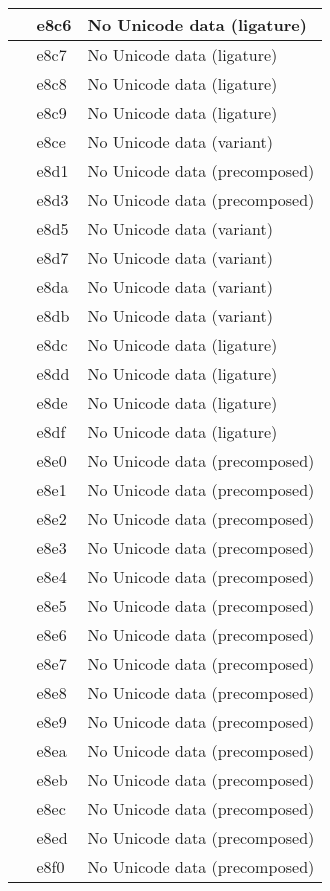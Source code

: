 \documentclass[12pt,letterpaper,openany]{book}
\begin{document}
\begin{center}
\begin{supertabular}{|m{0.25in}|m{0.5in}|m{4in}|}
 & e8c6 & No Unicode data (ligature)\\\hline
 & e8c7 & No Unicode data (ligature)\\\hline
 & e8c8 & No Unicode data (ligature)\\\hline
 & e8c9 & No Unicode data (ligature)\\\hline
 & e8ce & No Unicode data (variant)\\\hline
 & e8d1 & No Unicode data (precomposed)\\\hline
 & e8d3 & No Unicode data (precomposed)\\\hline
 & e8d5 & No Unicode data (variant)\\\hline
 & e8d7 & No Unicode data (variant)\\\hline
 & e8da & No Unicode data (variant)\\\hline
 & e8db & No Unicode data (variant)\\\hline
 & e8dc & No Unicode data (ligature)\\\hline
 & e8dd & No Unicode data (ligature)\\\hline
 & e8de & No Unicode data (ligature)\\\hline
 & e8df & No Unicode data (ligature)\\\hline
 & e8e0 & No Unicode data (precomposed)\\\hline
 & e8e1 & No Unicode data (precomposed)\\\hline
 & e8e2 & No Unicode data (precomposed)\\\hline
 & e8e3 & No Unicode data (precomposed)\\\hline
 & e8e4 & No Unicode data (precomposed)\\\hline
 & e8e5 & No Unicode data (precomposed)\\\hline
 & e8e6 & No Unicode data (precomposed)\\\hline
 & e8e7 & No Unicode data (precomposed)\\\hline
 & e8e8 & No Unicode data (precomposed)\\\hline
 & e8e9 & No Unicode data (precomposed)\\\hline
 & e8ea & No Unicode data (precomposed)\\\hline
 & e8eb & No Unicode data (precomposed)\\\hline
 & e8ec & No Unicode data (precomposed)\\\hline
 & e8ed & No Unicode data (precomposed)\\\hline
 & e8f0 & No Unicode data (precomposed)\\\hline

\end{supertabular}
\end{center}
\end{document}
